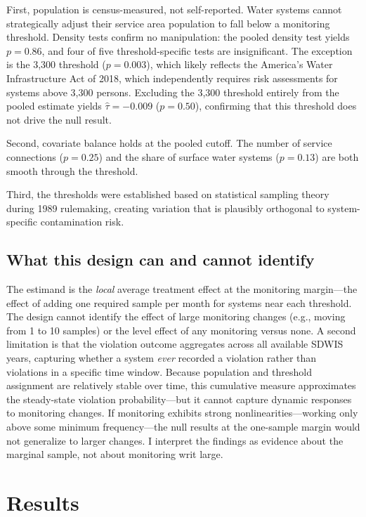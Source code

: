 \documentclass[12pt]{article}
\begin{document}
First, population is census-measured, not self-reported. Water systems cannot strategically adjust their service area population to fall below a monitoring threshold. Density tests \citep{cattaneo2020simple} confirm no manipulation: the pooled density test yields $p = 0.86$, and four of five threshold-specific tests are insignificant. The exception is the 3,300 threshold ($p = 0.003$), which likely reflects the America's Water Infrastructure Act of 2018, which independently requires risk assessments for systems above 3,300 persons. Excluding the 3,300 threshold entirely from the pooled estimate yields $\hat{\tau} = -0.009$ ($p = 0.50$), confirming that this threshold does not drive the null result.

Second, covariate balance holds at the pooled cutoff. The number of service connections ($p = 0.25$) and the share of surface water systems ($p = 0.13$) are both smooth through the threshold.

Third, the thresholds were established based on statistical sampling theory during 1989 rulemaking, creating variation that is plausibly orthogonal to system-specific contamination risk.

\subsection{What this design can and cannot identify}

The estimand is the \textit{local} average treatment effect at the monitoring margin---the effect of adding one required sample per month for systems near each threshold. The design cannot identify the effect of large monitoring changes (e.g., moving from 1 to 10 samples) or the level effect of any monitoring versus none. A second limitation is that the violation outcome aggregates across all available SDWIS years, capturing whether a system \textit{ever} recorded a violation rather than violations in a specific time window. Because population and threshold assignment are relatively stable over time, this cumulative measure approximates the steady-state violation probability---but it cannot capture dynamic responses to monitoring changes. If monitoring exhibits strong nonlinearities---working only above some minimum frequency---the null results at the one-sample margin would not generalize to larger changes. I interpret the findings as evidence about the marginal sample, not about monitoring writ large.


\section{Results}
\label{sec:results}
\end{document}
